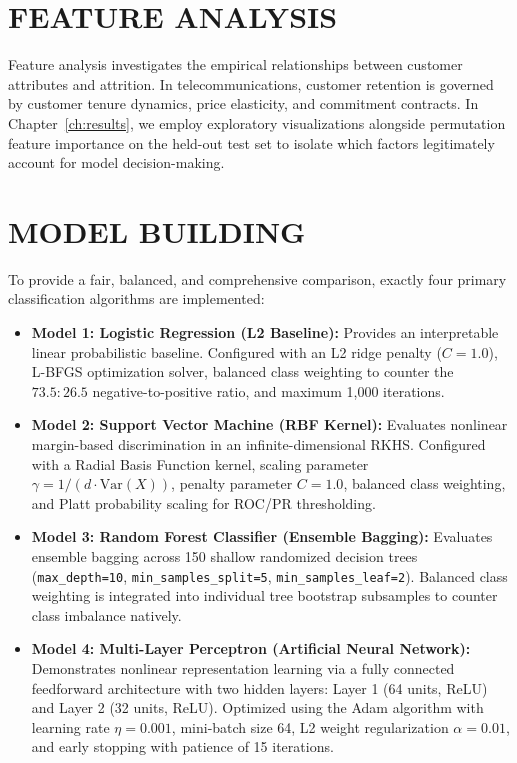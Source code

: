 \section{FEATURE ANALYSIS}
Feature analysis investigates the empirical relationships between customer attributes and attrition. In telecommunications, customer retention is governed by customer tenure dynamics, price elasticity, and commitment contracts. In Chapter~\ref{ch:results}, we employ exploratory visualizations alongside permutation feature importance on the held-out test set to isolate which factors legitimately account for model decision-making.

\section{MODEL BUILDING}
To provide a fair, balanced, and comprehensive comparison, exactly four primary classification algorithms are implemented:
\begin{itemize}
    \item \textbf{Model 1: Logistic Regression (L2 Baseline):}
    Provides an interpretable linear probabilistic baseline. Configured with an L2 ridge penalty ($C=1.0$), L-BFGS optimization solver, balanced class weighting to counter the $73.5:26.5$ negative-to-positive ratio, and maximum 1,000 iterations.
    
    \item \textbf{Model 2: Support Vector Machine (RBF Kernel):}
    Evaluates nonlinear margin-based discrimination in an infinite-dimensional RKHS. Configured with a Radial Basis Function kernel, scaling parameter $\gamma = 1 / (d \cdot \text{Var}(X))$, penalty parameter $C=1.0$, balanced class weighting, and Platt probability scaling for ROC/PR thresholding.
    
    \item \textbf{Model 3: Random Forest Classifier (Ensemble Bagging):}
    Evaluates ensemble bagging across 150 shallow randomized decision trees (\texttt{max\_depth=10}, \texttt{min\_samples\_split=5}, \texttt{min\_samples\_leaf=2}). Balanced class weighting is integrated into individual tree bootstrap subsamples to counter class imbalance natively.
    
    \item \textbf{Model 4: Multi-Layer Perceptron (Artificial Neural Network):}
    Demonstrates nonlinear representation learning via a fully connected feedforward architecture with two hidden layers: Layer 1 (64 units, ReLU) and Layer 2 (32 units, ReLU). Optimized using the Adam algorithm with learning rate $\eta=0.001$, mini-batch size 64, L2 weight regularization $\alpha=0.01$, and early stopping with patience of 15 iterations.
\end{itemize}

